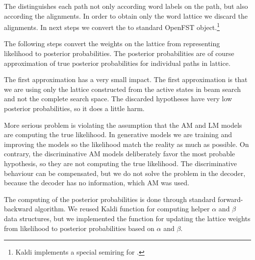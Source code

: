 The  distinguishes each path not only according word labels on the path,
but also according the alignments.
In order to obtain only the word lattice we discard the alignments.
In next steps we convert the  to standard OpenFST object.\footnote{Kaldi implements a special semiring for \cite{povey2012generating}.}  

The following steps convert the weights on the lattice from representing likelihood
to posterior probabilities. The posterior probabilities are of course approximation of
true posterior probabilities for individual paths in lattice. 

The first approximation has a very small impact. The first approximation is 
that we are using only the lattice constructed from the active states in beam search
and not the complete search space. 
The discarded hypotheses have very low posterior probabilities, so it does a little harm.

More serious problem is violating the assumption that the \ac{AM} and \ac{LM} models are 
computing the true likelihood. 
In generative models we are training and improving the models so the likelihood match
the reality as much as possible.
On contrary, the discriminative \ac{AM} models deliberately favor the most probable hypothesis,
so they are not computing the true likelihood.
The discriminative behaviour can be compensated, but we do not solve the problem
in the decoder, because the decoder has no information, which \ac{AM} was used.


The computing of the posterior probabilities is done through standard forward-backward algorithm. %
We reused Kaldi function for computing helper $\alpha$ and $\beta$ data structures, but we implemented the  function for updating the lattice weights from likelihood to posterior probabilities based on $\alpha$ and $\beta$.


